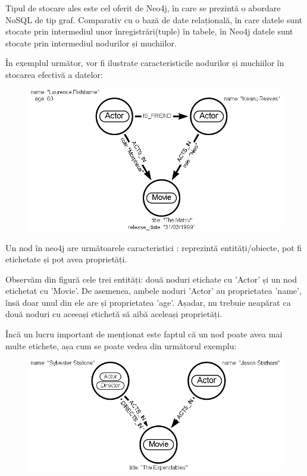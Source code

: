 \documentclass[12pt,a4paper]{report}
\begin{document}
Tipul de stocare ales este cel oferit de Neo4j, în care se prezintă o abordare NoSQL de tip graf.  Comparativ cu o bază de date relațională, în care datele sunt stocate prin intermediul unor înregistrări(tuple) în tabele, în Neo4j datele sunt stocate prin intermediul nodurilor și muchiilor.

În exemplul următor, vor fi ilustrate caracteristicile nodurilor și muchiilor în stocarea efectivă a datelor:


\begin{figure}[h]
\centering
\caption{}
\includegraphics[scale=0.5]{exemplu_1_neo4j}
\caption*{}
\end{figure}


Un nod în neo4j are următoarele caracteristici \cite{6}: reprezintă entități/obiecte, pot fi etichetate și pot avea proprietăți.

Observăm din figură cele trei entități: două noduri etichate cu 'Actor' și un nod etichetat cu 'Movie'. De asemenea, ambele noduri 'Actor' au proprietatea 'name', însă doar unul din ele are și proprietatea 'age'. Așadar, nu trebuie neapărat ca două noduri cu aceeași etichetă să aibă aceleași proprietăți.

Încă un lucru important de menționat este faptul că un nod poate avea mai multe etichete, așa cum se poate vedea din următorul exemplu:


\begin{figure}[h]
\centering
\caption{}
\includegraphics[scale=0.5]{exemplu_2_neo4j}
\caption*{}
\end{figure}
\end{document}
